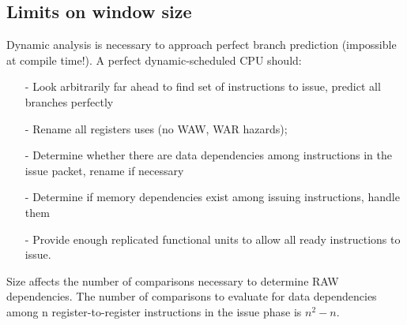 \subsection{Limits on window size}\label{subsec:limits-on-window-size}
Dynamic analysis is necessary to approach
perfect branch prediction (impossible at compile
time!).
A perfect dynamic-scheduled CPU should:
\begin{itemize}[noitemsep]
    \item[-] Look arbitrarily far ahead to find set of instructions to
    issue, predict all branches perfectly
    \item[-] Rename all registers uses (no WAW, WAR hazards);
    \item[-] Determine whether there are data dependencies
    among instructions in the issue packet, rename if
    necessary
    \item[-] Determine if memory dependencies exist among
    issuing instructions, handle them
    \item[-] Provide enough replicated functional units to allow all
    ready instructions to issue.
\end{itemize}
Size affects the number of comparisons necessary to determine
RAW dependencies.
The number of comparisons to evaluate for data dependencies among n register-to-register
instructions in the issue phase is \(n^2 - n\).
